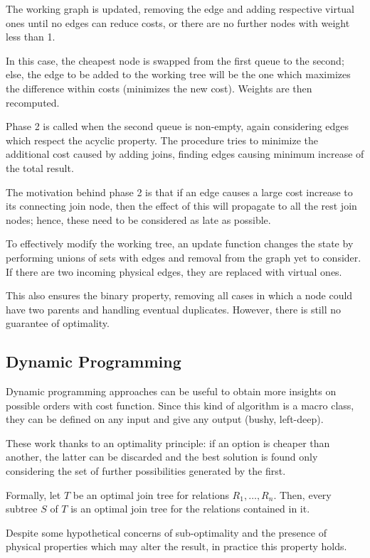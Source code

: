 The working graph is updated, removing the edge and adding respective virtual ones until no edges can reduce costs, or there are no further nodes with weight less than 1.

In this case, the cheapest node is swapped from the first queue to the second; else, the edge to be added to the working tree will be the one which maximizes the difference within costs (minimizes the new cost). Weights are then recomputed. 

Phase 2 is called when the second queue is non-empty, again considering edges which respect the acyclic property. The procedure tries to minimize the additional cost caused by adding joins, finding edges causing minimum increase of the total result. 

The motivation behind phase 2 is that if an edge causes a large cost increase to its connecting join node, then the effect of this will propagate to all the rest join nodes; hence, these need to be considered as late as possible.

To effectively modify the working tree, an update function changes the state by performing unions of sets with edges and removal from the graph yet to consider. If there are two incoming physical edges, they are replaced with virtual ones. 

This also ensures the binary property, removing all cases in which a node could have two parents and handling eventual duplicates. However, there is still no guarantee of optimality. 

\subsection{Dynamic Programming}
Dynamic programming approaches can be useful to obtain more insights on possible orders with cost function. Since this kind of algorithm is a macro class, they can be defined on any input and give any output (bushy, left-deep).

These work thanks to an optimality principle: if an option is cheaper than another, the latter can be discarded and the best solution is found only considering the set of further possibilities generated by the first.

Formally, let $T$ be an optimal join tree for relations $R_1, \dots, R_n$. Then, every subtree $S$ of $T$ is an optimal join tree for the relations contained in it.

Despite some hypothetical concerns of sub-optimality and the presence of physical properties which may alter the result, in practice this property holds.

